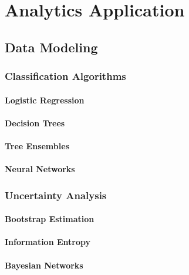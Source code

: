 \chapter{Analytics Application}\label{ch5:expl_applied}

\section{Data Modeling}

\subsection{Classification Algorithms}

\subsubsection{Logistic Regression}

\subsubsection{Decision Trees}

\subsubsection{Tree Ensembles}

\subsubsection{Neural Networks}

\subsection{Uncertainty Analysis}

\subsubsection{Bootstrap Estimation}

\subsubsection{Information Entropy}

\subsubsection{Bayesian Networks}
